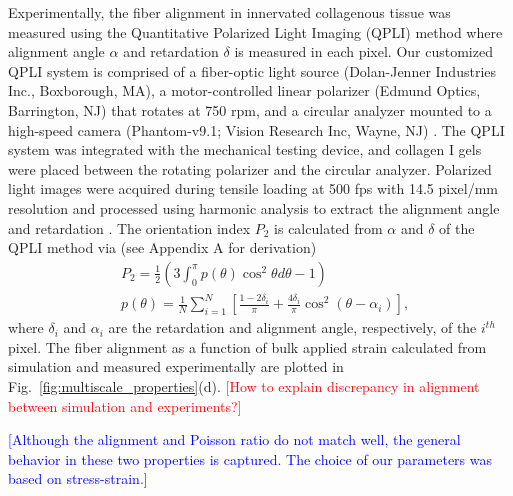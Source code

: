 \documentclass[]{interact}
\newcommand{\blue}[1]{\textcolor{blue}{[#1]}}
\newcommand{\red}[1]{\textcolor{red}{[#1]}}
\begin{document}
Experimentally, the fiber alignment in innervated collagenous tissue was measured using the Quantitative Polarized Light Imaging (QPLI) method \citep{Quinn:2008df,Quinn:2009bf} where alignment angle $\alpha$ and retardation $\delta$ is measured in each pixel. Our customized QPLI system \citep{Zhang:2016ga} is comprised of a fiber-optic light source (Dolan-Jenner Industries Inc., Boxborough, MA), a motor-controlled linear polarizer (Edmund Optics, Barrington, NJ) that rotates at 750 rpm, and a circular analyzer mounted to a high-speed camera (Phantom-v9.1; Vision Research Inc, Wayne, NJ) \citep{Zhang:2016ga}. The QPLI system was integrated with the mechanical testing device, and collagen I gels were placed between the rotating polarizer and the circular analyzer. Polarized light images were acquired during tensile loading at 500 fps with 14.5 pixel/mm resolution and processed using harmonic analysis to extract the alignment angle and retardation \citep{Tower:2002hk,Quinn:2008df}. The orientation index $P_2$ is calculated from $\alpha$ and $\delta$ of the QPLI method via (see Appendix A for derivation)
%
\begin{align}
&P_2 = \frac{1}{2}\left(3 \int_0^{\pi} p(\theta) \cos^2\theta d\theta - 1\right) \nonumber\\
&p(\theta) = \frac{1}{N} \sum_{i=1}^N \left[ \frac{1-2\delta_i}{\pi} + \frac{4 \delta_i}{\pi}\cos^2(\theta - \alpha_i)\right],
\label{eq:P2_experiment}
\end{align}
%
where $\delta_i$ and $\alpha_i$ are the retardation and alignment angle, respectively, of the $i^{th}$ pixel. The fiber alignment as a function of bulk applied strain calculated from simulation and measured experimentally are plotted in Fig.\ \ref{fig:multiscale_properties}(d). \red{How to explain discrepancy in alignment between simulation and experiments?}  

\blue{Although the alignment and Poisson ratio do not match well, the general behavior in these two properties is captured. The choice of our parameters was based on stress-strain.}

\end{document}
